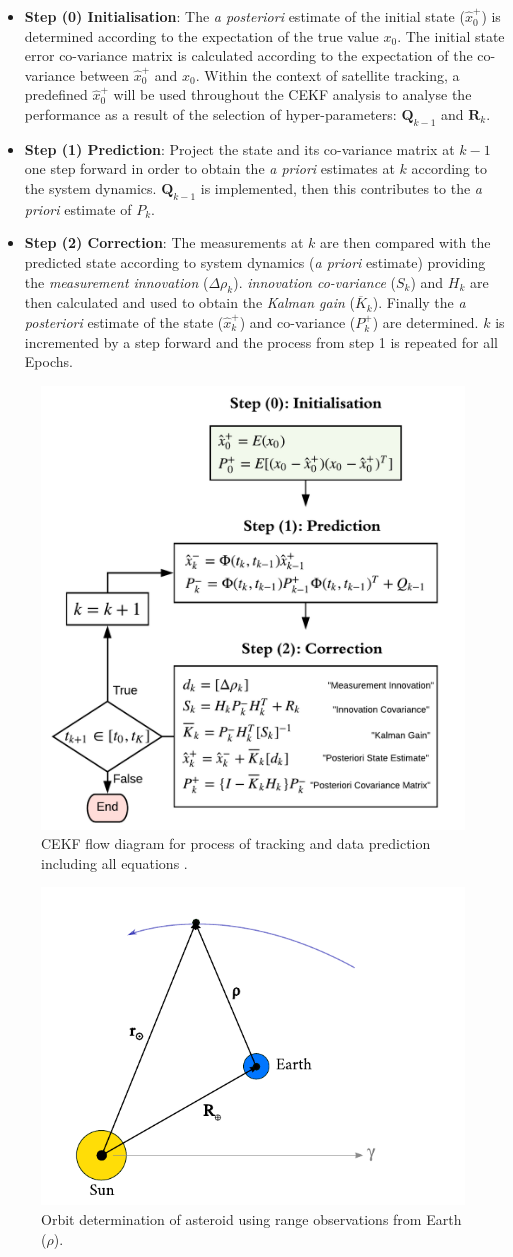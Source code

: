  \begin{itemize}
     \item \textbf{Step (0) Initialisation}: The \textit{a posteriori} estimate of the initial state ($\hat{x}_0^+$) is determined according to the expectation of the true value $x_0$. The initial state error co-variance matrix is calculated according to the expectation of the co-variance between $\hat{x}_0^+$ and $x_0$. Within the context of satellite tracking, a predefined $\hat{x}_0^+$ will be used throughout the CEKF analysis to analyse the performance as a result of the selection of hyper-parameters: $\bm{Q}_{k-1}$ and $\bm{R}_k$.
     \item \textbf{Step (1) Prediction}: Project the state and its co-variance matrix at $k-1$ one step forward in order to obtain the \textit{a priori} estimates at $k$ according to the system dynamics. $\bm{Q}_{k-1}$ is implemented, then this contributes to the \textit{a priori} estimate of $P_k^{}$.
    \item \textbf{Step (2) Correction}: The measurements at $k$ are then compared with the predicted state according to system dynamics (\textit{a priori} estimate) providing the \textit{measurement innovation} ($\Delta{\rho}_k$). \textit{innovation co-variance} ($S_k$) and $H_k$ are then calculated and used to obtain the \textit{Kalman gain} ($\overline{K}_k$). Finally the \textit{a posteriori} estimate of the state ($\hat{x}_k^+$) and co-variance ($P_k^+$) are determined. $k$ is incremented by a step forward and the process from step 1 is repeated for all Epochs.
 \end{itemize}

\begin{figure}[htp]
    \centering
    \includegraphics[width=0.55\linewidth]{graphics/CEKF.png}
    \caption{CEKF flow diagram for process of tracking and data prediction including all equations \cite{3}.}
    \label{fig:CEKF}
\end{figure}


\begin{figure}[htp]
    \centering
    \includegraphics[width=0.5\linewidth]{graphics/pod-1.pdf}
    \caption{Orbit determination of asteroid using range observations from Earth ($\rho$).}
    \label{fig:my_label}
\end{figure}
